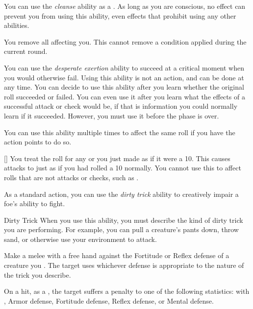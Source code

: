          You can use the \textit{cleanse} ability as a .
        As long as you are conscious, no effect can prevent you from using this ability, even effects that prohibit using any other abilities.
        \begin{apability}{}
            You remove all  affecting you.
            This cannot remove a condition applied during the current round.
        \end{apability}

         You can use the \textit{desperate exertion} ability to succeed at a critical moment when you would otherwise fail.
        Using this ability is not an action, and can be done at any time.
        You can decide to use this ability after you learn whether the original roll succeeded or failed.
        You can even use it after you learn what the effects of a successful attack or check would be, if that is information you could normally learn if it succeeded.
        However, you must use it before the phase is over.

        You can use this ability multiple times to affect the same roll if you have the action points to do so.

        \begin{apability}{}[]
            You treat the roll for any  or  you just made as if it were a 10.
            This causes attacks to  just as if you had rolled a 10 normally.
            You cannot use this to affect rolls that are not attacks or checks, such as .
        \end{apability}

         As a standard action, you can use the \textit{dirty trick} ability to creatively impair a foe's ability to fight.

        \begin{freeability}{Dirty Trick}\label{Dirty Trick}
            When you use this ability, you must describe the kind of dirty trick you are performing.
            For example, you can pull a creature's pants down, throw sand, or otherwise use your environment to attack.

            Make a melee  with a free hand against the Fortitude or Reflex defense of a creature you .
            The target uses whichever defense is appropriate to the nature of the trick you describe.

            On a hit, as a , the target suffers a  penalty to one of the following statistics:
             with , Armor defense, Fortitude defense, Reflex defense, or Mental defense.
        \end{freeability}

